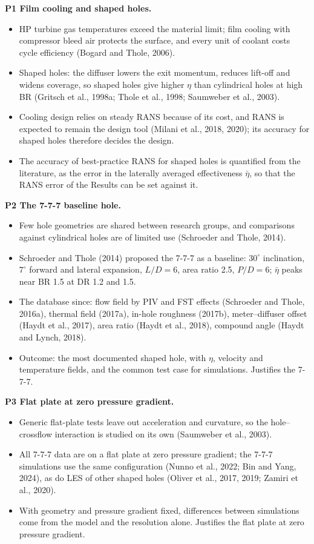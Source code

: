 \documentclass[10pt]{article}
\begin{document}
\textbf{P1 Film cooling and shaped holes.}
\begin{itemize}
\item HP turbine gas temperatures exceed the material limit; film cooling with compressor bleed air protects the
  surface, and every unit of coolant costs cycle efficiency (Bogard and Thole, 2006).
\item Shaped holes: the diffuser lowers the exit momentum, reduces lift-off and widens coverage, so shaped holes
  give higher $\eta$ than cylindrical holes at high BR (Gritsch et al., 1998a; Thole et al., 1998; Saumweber et
  al., 2003).
\item Cooling design relies on steady RANS because of its cost, and RANS is expected to remain the design tool
  (Milani et al., 2018, 2020); its accuracy for shaped holes therefore decides the design.
\item The accuracy of best-practice RANS for shaped holes is quantified from the literature, as the error in the
  laterally averaged effectiveness $\bar\eta$, so that the RANS error of the Results can be set against it.
\end{itemize}

\textbf{P2 The 7-7-7 baseline hole.}
\begin{itemize}
\item Few hole geometries are shared between research groups, and comparisons against cylindrical holes are of
  limited use (Schroeder and Thole, 2014).
\item Schroeder and Thole (2014) proposed the 7-7-7 as a baseline: $30^\circ$ inclination, $7^\circ$ forward and
  lateral expansion, $L/D=6$, area ratio 2.5, $P/D=6$; $\bar\eta$ peaks near BR 1.5 at DR 1.2 and 1.5.
\item The database since: flow field by PIV and FST effects (Schroeder and Thole, 2016a), thermal field (2017a),
  in-hole roughness (2017b), meter--diffuser offset (Haydt et al., 2017), area ratio (Haydt et al., 2018),
  compound angle (Haydt and Lynch, 2018).
\item Outcome: the most documented shaped hole, with $\eta$, velocity and temperature fields, and the common test
  case for simulations. Justifies the 7-7-7.
\end{itemize}

\textbf{P3 Flat plate at zero pressure gradient.}
\begin{itemize}
\item Generic flat-plate tests leave out acceleration and curvature, so the hole--crossflow interaction is
  studied on its own (Saumweber et al., 2003).
\item All 7-7-7 data are on a flat plate at zero pressure gradient; the 7-7-7 simulations use the same
  configuration (Nunno et al., 2022; Bin and Yang, 2024), as do LES of other shaped holes (Oliver et al., 2017,
  2019; Zamiri et al., 2020).
\item With geometry and pressure gradient fixed, differences between simulations come from the model and the
  resolution alone. Justifies the flat plate at zero pressure gradient.
\end{itemize}
\end{document}
